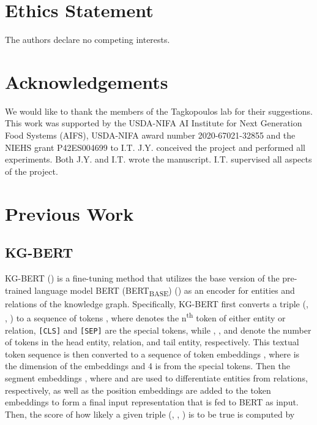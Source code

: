 \documentclass[11pt]{article}
\begin{document}
\section*{Ethics Statement}
The authors declare no competing interests.

\section*{Acknowledgements}
We would like to thank the members of the Tagkopoulos lab for their suggestions. This work was supported by the USDA-NIFA AI Institute for Next Generation Food Systems (AIFS), USDA-NIFA award number 2020-67021-32855 and the NIEHS grant P42ES004699 to I.T. J.Y. conceived the project and performed all experiments. Both J.Y. and I.T. wrote the manuscript. I.T. supervised all aspects of the project.




\appendix

\section{Previous Work}
\label{sec:previous_work}

\subsection{KG-BERT}
KG-BERT (\citealp{yao2019kg}) is a fine-tuning method that utilizes the base version of the pre-trained language model BERT (BERT\textsubscript{BASE}) (\citealp{devlin2018bert}) as an encoder for entities and relations of the knowledge graph. Specifically, KG-BERT first converts a triple (, , ) to a sequence of tokens , where  denotes the n\textsuperscript{th} token of either entity or relation, \texttt{[CLS]} and \texttt{[SEP]} are the special tokens, while , , and  denote the number of tokens in the head entity, relation, and tail entity, respectively. This textual token sequence is then converted to a sequence of token embeddings , where  is the dimension of the embeddings and 4 is from the special tokens. Then the segment embeddings , where  and  are used to differentiate entities from relations, respectively, as well as the position embeddings  are added to the token embeddings  to form a final input representation  that is fed to BERT as input. Then, the score of how likely a given triple (, , ) is to be true is computed by
\end{document}
